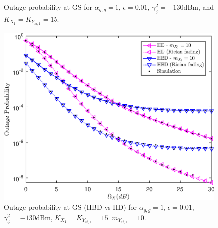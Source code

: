 \begin{figure}[t]
\centering
\vspace{0.2cm}
\hfil
{}
\caption{Outage probability at GS for $\alpha_{g,g}=1$, $\epsilon=0.01$, $\gamma_{\phi}^2=-130$dBm, and $K_{X_1}=K_{Y_{si,1}}=15$.}
\end{figure}

\begin{figure}[t]
\centering
\vspace{0.2cm}
\includegraphics [width=0.45\columnwidth]{chap5_fig/gs_outage_HBD_vs_HD.eps} 
\caption{Outage probability at GS (HBD vs HD) for $\alpha_{g,g}=1$, $\epsilon=0.01$, $\gamma_{\phi}^2=-130$dBm, $K_{X_1}=K_{Y_{si,1}}=15$, $m_{Y_{si,1}}=10$.}
\label{fig:HBD_UCS_Rician_Shadowed_gs_outage_HBD_vs_HD}
\end{figure}

